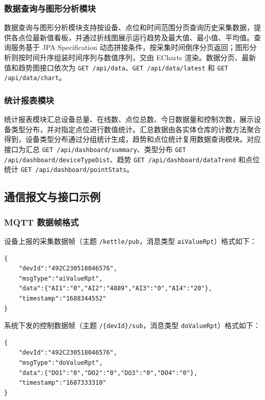 \documentclass[12pt,hyperref,a4paper,UTF8]{ctexart}
\begin{document}
\subsubsection{数据查询与图形分析模块}

数据查询与图形分析模块支持按设备、点位和时间范围分页查询历史采集数据，提供各点位最新值看板，并通过折线图展示运行趋势及最大值、最小值、平均值。查询服务基于 JPA Specification 动态拼接条件，按采集时间倒序分页返回；图形分析则按时间升序组装时间序列与数值序列，交由 ECharts 渲染。数据分页、最新值和趋势图接口依次为 \texttt{GET /api/data}、\texttt{GET /api/data/latest} 和 \texttt{GET /api/data/chart}。

\subsubsection{统计报表模块}

统计报表模块汇总设备总量、在线数、点位总数、今日数据量和控制次数，展示设备类型分布，并对指定点位进行数值统计。汇总数据由各实体仓库的计数方法聚合得到，设备类型分布通过分组统计生成，趋势和点位统计复用数据查询模块。对应接口为汇总 \texttt{GET /api/dashboard/summary}、类型分布 \texttt{GET /api/dashboard/deviceTypeDist}、趋势 \texttt{GET /api/dashboard/dataTrend} 和点位统计 \texttt{GET /api/dashboard/pointStats}。

\subsection{通信报文与接口示例}

\subsubsection{MQTT 数据帧格式}

设备上报的采集数据帧（主题 \texttt{/kettle/pub}，消息类型 \texttt{aiValueRpt}）格式如下：

\begin{verbatim}
{
    "devId":"492C230518046576",
    "msgType":"aiValueRpt",
    "data":{"AI1":"0","AI2":"4889","AI3":"0","AI4":"20"},
    "timestamp":"1688344552"
}
\end{verbatim}

系统下发的控制数据帧（主题 \texttt{/\{devId\}/sub}，消息类型 \texttt{doValueRpt}）格式如下：

\begin{verbatim}
{
    "devId":"492C230518046576",
    "msgType":"doValueRpt",
    "data":{"DO1":"0","DO2":"0","DO3":"0","DO4":"0"},
    "timestamp":"1687333310"
}
\end{verbatim}
\end{document}

